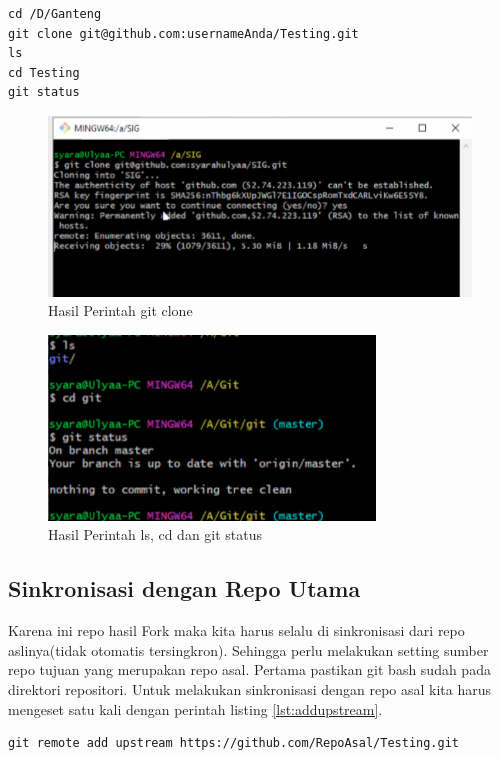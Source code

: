 \begin{lstlisting}[caption=Navigasi direktori menuju repositori,label={lst:navigasikerepo}]
cd /D/Ganteng
git clone git@github.com:usernameAnda/Testing.git
ls 
cd Testing
git status
\end{lstlisting}

\begin{figure}[!htbp]
\centerline{\includegraphics[width=.75\textwidth]{Figures/gitclone}}
\caption{Hasil Perintah git clone}
\label{gitclone}
\end{figure}
\begin{figure}[!htbp]
\centerline{\includegraphics[width=.75\textwidth]{Figures/lscdstatus}}
\caption{Hasil Perintah ls, cd dan git status}
\label{lscdstatus}
\end{figure}

\subsection{Sinkronisasi dengan Repo Utama}

Karena ini repo hasil Fork maka kita harus selalu di sinkronisasi dari repo aslinya(tidak otomatis tersingkron). Sehingga perlu melakukan setting sumber repo tujuan yang merupakan repo asal. Pertama pastikan git bash sudah pada direktori repositori. Untuk melakukan sinkronisasi dengan repo asal kita harus mengeset satu kali dengan perintah listing \ref{lst:addupstream}.

\begin{lstlisting}[caption=Set Repo Asal Sebagai Upstream,label={lst:addupstream}]
git remote add upstream https://github.com/RepoAsal/Testing.git
\end{lstlisting}


